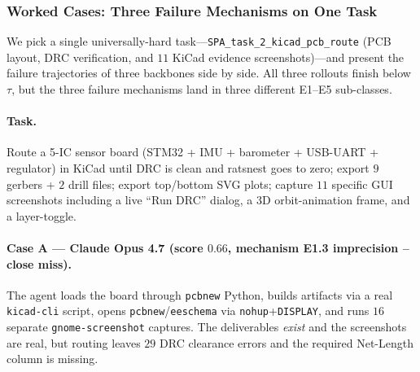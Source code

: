 \subsubsection{Worked Cases: Three Failure Mechanisms on One Task}
\label{app:failure-3way}

We pick a single universally-hard task---\texttt{SPA\_task\_2\_kicad\_pcb\_route} (PCB layout, DRC verification, and $11$ KiCad evidence screenshots)---and present the failure trajectories of three backbones side by side. All three rollouts finish below $\tau$, but the three failure mechanisms land in three different E1--E5 sub-classes.

\paragraph{Task.} Route a 5-IC sensor board (STM32 + IMU + barometer + USB-UART + regulator) in KiCad until DRC is clean and ratsnest goes to zero; export $9$ gerbers + $2$ drill files; export top/bottom SVG plots; capture $11$ specific GUI screenshots including a live ``Run DRC'' dialog, a 3D orbit-animation frame, and a layer-toggle.

\paragraph{Case A --- Claude Opus 4.7 (score $0.66$, mechanism E1.3 imprecision -- close miss).} The agent loads the board through \texttt{pcbnew} Python, builds artifacts via a real \texttt{kicad-cli} script, opens \texttt{pcbnew}/\texttt{eeschema} via \texttt{nohup}+\texttt{DISPLAY}, and runs $16$ separate \texttt{gnome-screenshot} captures. The deliverables \emph{exist} and the screenshots are real, but routing leaves $29$ DRC clearance errors and the required Net-Length column is missing.

